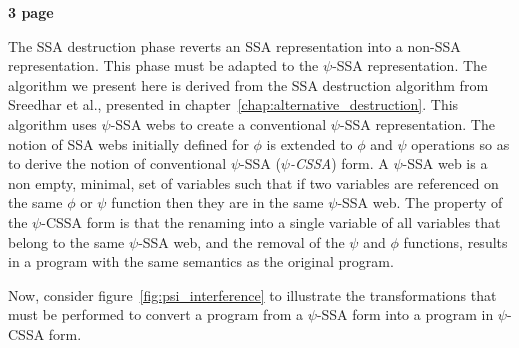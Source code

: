\textbf{3 page}


The SSA destruction phase reverts an SSA representation into a non-SSA
representation. This phase must be adapted to the $\psi$-SSA
representation. The algorithm we present here is derived from the SSA
destruction algorithm from Sreedhar et al., presented in
chapter~\ref{chap:alternative_destruction}. This algorithm uses
$\psi$-SSA webs to create a conventional $\psi$-SSA
representation. The notion of SSA webs initially defined for $\phi$ is
extended to $\phi$ and $\psi$ operations so as to derive the notion of
conventional $\psi$-SSA ({\em $\psi$-CSSA}) form. A $\psi$-SSA web is
a non empty, minimal, set of variables such that if two variables are
referenced on the same $\phi$ or $\psi$ function then they are in the
same $\psi$-SSA web. The property of the $\psi$-CSSA form is that the
renaming into a single variable of all variables that belong to the
same $\psi$-SSA web, and the removal of the $\psi$ and $\phi$
functions, results in a program with the same semantics as the
original program.


Now, consider figure~\ref{fig:psi_interference} to illustrate the
transformations that must be performed to convert a program from a
$\psi$-SSA form into a program in $\psi$-CSSA form.


